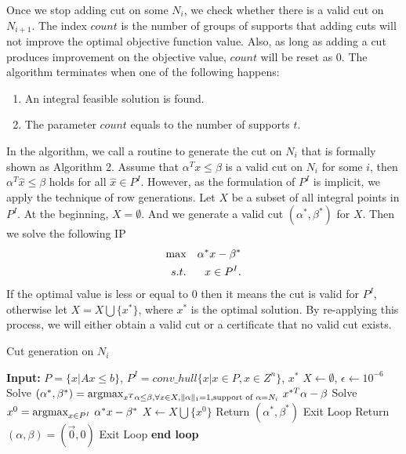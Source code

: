 \documentclass[smallextended]{svjour3}
\begin{document}
Once we stop adding cut on some $N_i$, we check whether there is a valid cut on $N_{i+1}$. The index $count$ is the number of groups of supports that adding cuts will not improve the optimal objective function value. Also, as long as adding a cut produces improvement on the objective value, $count$ will be reset as 0. The algorithm terminates when one of the following happens:
\begin{enumerate}
\item An integral feasible solution is found.
\item The parameter $count$ equals to the number of supports $t$.
\end{enumerate}

In the algorithm, we call a routine to generate the cut on $N_i$ that is formally shown as Algorithm 2. 
Assume that $\alpha^T x \leq \beta$ is a valid cut on $N_i$
for some $i$, then $\alpha^T \hat{x}  \leq \beta$ holds for all
$\hat{x}\in P^I$. However, as the formulation of $P^I$ is implicit,
we apply the technique of row generations. Let $X$ be a subset of
all integral points in $P^I$. At the beginning, $X = \emptyset$. And
we generate a valid cut $(\alpha^*, \beta^*)$ for $X$. Then we solve
the following IP
\begin{eqnarray*}
\textup{max} && \alpha^* x -\beta^* \\
s.t. && x \in P^I.
\end{eqnarray*}
If the optimal value is less or equal to 0 then it means the cut is
valid for $P^I$, otherwise let $X = X \bigcup \{x^*\}$, where $x^*$
is the optimal solution. By re-applying this process, we will
either obtain a valid cut or a certificate that no valid cut exists.

\begin{algorithm}[h!]\label{alg:2}
\caption{Cut generation on $N_i$}
\begin{algorithmic}
\STATE \textbf{Input:} {$P = \{x | Ax \leq b \}$, $P^I = conv\_hull\{x| x\in P, x\in Z^n\}$, $x^*$} 
\STATE $X \leftarrow \emptyset$, $\epsilon \leftarrow 10^{-6}$
\LOOP
\STATE Solve $(\alpha^*,\beta^*) = \textup{argmax}_{x^T \alpha \leq \beta,\forall x \in X,\|\alpha\|_1 = 1, \textup{support of } \alpha = N_i} ~x^{*T}\alpha - \beta$
\STATE Solve $x^0 = \textup{argmax}_{x \in P^I} ~\alpha^* x -\beta^* $
\STATE  $X \leftarrow X\bigcup \{x^0\}$
\ELSE
\STATE Return $(\alpha^*,\beta^*) $
\STATE Exit Loop
\ENDIF
\STATE Return $(\alpha,\beta) = (\vec{0},0)$
\STATE Exit Loop
\ENDIF
\STATE 
\ENDLOOP
\textbf{end loop}
\end{algorithmic}
\end{algorithm}
\end{document}
